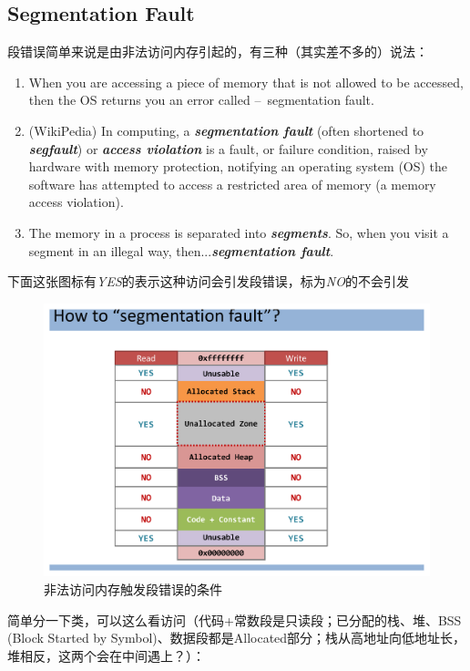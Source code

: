 \documentclass[]{report}
\renewcommand{\emph}[1]{\textbf{\textit{#1}}}
\begin{document}
		\subsection{Segmentation Fault}
		段错误简单来说是由非法访问内存引起的，有三种（其实差不多的）说法：
		\begin{enumerate}
			\item When you are accessing a piece of memory that is not allowed to be accessed, then the OS returns you an error called –\ segmentation fault.
			\item (WikiPedia) In computing, a \emph{segmentation fault} (often shortened to \emph{segfault}) or \emph{access violation} is a fault, or failure condition, raised by hardware with memory protection, notifying an operating system (OS) the software has attempted to access a restricted area of memory (a memory access violation).
			\item The memory in a process is separated into \emph{segments}. So, when you visit a segment in an illegal way, then...\emph{segmentation fault}.
		\end{enumerate}\par
		下面这张图标有\textsf{\textit{YES}}的表示这种访问会引发段错误，标为\textsf{\textit{NO}}的不会引发
		\begin{figure}[h]
			\centering
			\begin{minipage}{40em}
				\centering
				\includegraphics[scale = 0.4]{images/Segmentation_Fault.pdf}
				\caption{非法访问内存触发段错误的条件}
			\end{minipage}
		\end{figure}\par
		简单分一下类，可以这么看访问（代码+常数段是只读段；已分配的栈、堆、BSS (Block Started by Symbol)、数据段都是Allocated部分；栈从高地址向低地址长，堆相反，这两个会在中间遇上？）：
\end{document}
